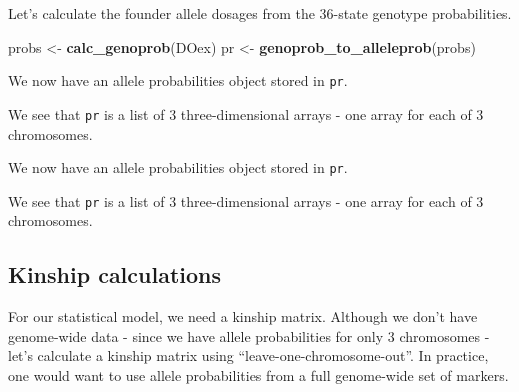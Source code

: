 \documentclass[oneside]{book}\usepackage[]{graphicx}\usepackage[]{color}
\newenvironment{Shaded}{\begin{snugshade}}{\end{snugshade}}
\newcommand{\CommentTok}[1]{\textcolor[rgb]{0.56,0.35,0.01}{\textit{#1}}}
\newcommand{\DataTypeTok}[1]{\textcolor[rgb]{0.13,0.29,0.53}{#1}}
\newcommand{\KeywordTok}[1]{\textcolor[rgb]{0.13,0.29,0.53}{\textbf{#1}}}
\newcommand{\NormalTok}[1]{#1}
\newcommand{\OperatorTok}[1]{\textcolor[rgb]{0.81,0.36,0.00}{\textbf{#1}}}
\newcommand{\StringTok}[1]{\textcolor[rgb]{0.31,0.60,0.02}{#1}}
\begin{document}
Let's calculate the founder allele dosages from the 36-state genotype
probabilities.

\begin{Shaded}
\begin{Highlighting}[]
\NormalTok{probs <-}\StringTok{ }\KeywordTok{calc_genoprob}\NormalTok{(DOex)}
\NormalTok{pr <-}\StringTok{ }\KeywordTok{genoprob_to_alleleprob}\NormalTok{(probs)}
\end{Highlighting}
\end{Shaded}

We now have an allele probabilities object stored in \texttt{pr}.

\begin{Shaded}
\end{Shaded}

We see that \texttt{pr} is a list of 3 three-dimensional arrays - one
array for each of 3 chromosomes.

We now have an allele probabilities object stored in \texttt{pr}.

\begin{Shaded}
\end{Shaded}

We see that \texttt{pr} is a list of 3 three-dimensional arrays - one
array for each of 3 chromosomes.

\hypertarget{kinship-calculations}{%
\subsection{Kinship calculations}\label{kinship-calculations}}

For our statistical model, we need a kinship matrix. Although we don't
have genome-wide data - since we have allele probabilities for only 3
chromosomes - let's calculate a kinship matrix using
``leave-one-chromosome-out''. In practice, one would want to use allele
probabilities from a full genome-wide set of markers.
\end{document}
